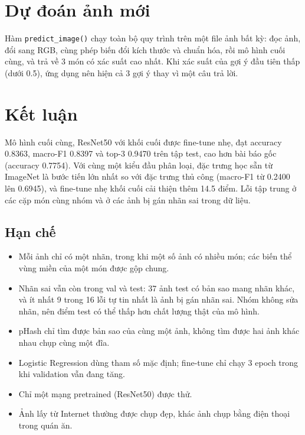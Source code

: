 \section{Dự đoán ảnh mới}

Hàm \texttt{predict\_image()} chạy toàn bộ quy trình trên một file ảnh bất kỳ: đọc ảnh, đổi sang RGB, cùng phép biến đổi
kích thước và chuẩn hóa, rồi mô hình cuối cùng, và trả về 3 món có xác suất cao nhất. Khi xác suất của gợi ý đầu tiên
thấp (dưới 0.5), ứng dụng nên hiện cả 3 gợi ý thay vì một câu trả lời.


\section{Kết luận}

Mô hình cuối cùng, ResNet50 với khối cuối được fine-tune nhẹ, đạt accuracy 0.8363, macro-F1 0.8397 và top-3 0.9470
trên tập test, cao hơn bài báo gốc (accuracy 0.7754). Với cùng một kiểu đầu phân loại, đặc trưng học sẵn từ ImageNet là
bước tiến lớn nhất so với đặc trưng thủ công (macro-F1 từ 0.2400 lên 0.6945), và fine-tune nhẹ khối cuối cải thiện thêm
14.5 điểm. Lỗi tập trung ở các cặp món cùng nhóm và ở các ảnh bị gán nhãn sai trong dữ liệu.

\subsection*{Hạn chế}
\begin{itemize}
  \item Mỗi ảnh chỉ có một nhãn, trong khi một số ảnh có nhiều món; các biến thể vùng miền của một món được gộp chung.
  \item Nhãn sai vẫn còn trong val và test: 37 ảnh test có bản sao mang nhãn khác, và ít nhất 9 trong 16 lỗi tự tin
        nhất là ảnh bị gán nhãn sai. Nhóm không sửa nhãn, nên điểm test có thể thấp hơn chất lượng thật của mô hình.
  \item pHash chỉ tìm được bản sao của cùng một ảnh, không tìm được hai ảnh khác nhau chụp cùng một đĩa.
  \item Logistic Regression dùng tham số mặc định; fine-tune chỉ chạy 3 epoch trong khi validation vẫn đang tăng.
  \item Chỉ một mạng pretrained (ResNet50) được thử.
  \item Ảnh lấy từ Internet thường được chụp đẹp, khác ảnh chụp bằng điện thoại trong quán ăn.
\end{itemize}

